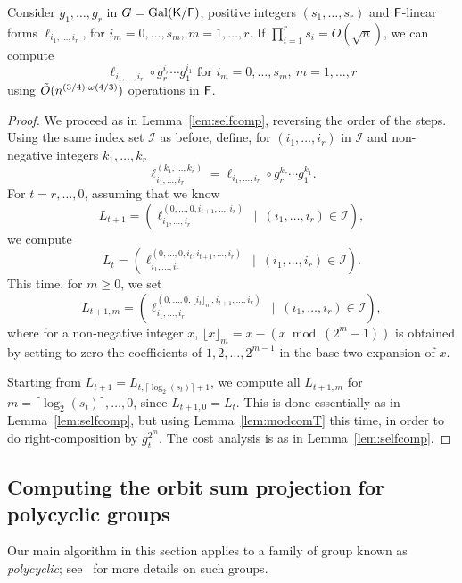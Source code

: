 \begin{lemma}
  \label{lem:transmodcomp}
  Consider $g_1, \ldots, g_r$ in $G=\mathrm{Gal}({\mathsf{K}}/{\mathsf{F}})$, positive
  integers $(s_1, \ldots, s_r)$ and ${\mathsf{F}}$-linear forms $\ell_{i_1,
    \dots, i_r}$, for $i_m=0,\dots,s_m$, $m=1,\dots,r$. If $\prod_{i =
    1}^r s_i = O(\sqrt{n})$, we can compute
  $$\ell_{i_1, \dots, i_r} \circ g_r^{i_r}\cdots g_1^{i_1}
  \text{~for~} i_m=0,\dots,s_m,\ m=1,\dots,r
  $$  using $\tilde{O}(n^{(3/4)\cdot \omega(4/3)})$ operations in ${\mathsf{F}}$.
\end{lemma} 
\begin{proof}
  We proceed as in Lemma~\ref{lem:selfcomp}, reversing the order of
  the steps. Using the same index set $\mathcal I$ as before, define,
  for $(i_1,\dots,i_r)$ in $\mathcal I$ and non-negative integers
  $k_1,\dots,k_r$
  $$\ell_{i_1,\dots,i_r}^{(k_1,\dots,k_r)} =\ell_{i_1,\dots,i_r} \circ g_r^{k_r}\cdots g_1^{k_1}.$$
  For $t=r,\dots,0$, assuming that
  we know 
  $$L_{t+1} = (\ell_{i_1, \dots,i_r}^{(0, \dots, 0,i_{t+1},\dots,i_r)} \ \mid
  \ (i_1,\dots,i_r)\in \mathcal I),$$ we compute 
  $$L_{t}=(\ell_{i_1, \dots,i_r}^{(0, \dots, 0,i_{t},i_{t+1},\dots,i_r)}
  \ \mid \ (i_1,\dots,i_r)\in \mathcal I).$$
  This time, for $m \ge 0$, we set
  $$L_{t+1,m} = (\ell_{i_1, \dots,i_r}^{(0, \dots, 0,\lfloor i_{t}
    \rfloor_m,i_{t+1},\dots,i_r)} \ \mid \ (i_1,\dots,i_r)\in \mathcal
  I),$$ where for a non-negative integer $x$, $\lfloor x \rfloor_m = x
  - (x \bmod (2^m-1))$ is obtained by setting to zero the coefficients
  of $1,2,\dots,2^{m-1}$ in the base-two expansion of $x$.

  Starting from $L_{t+1} = L_{t, \lceil \log_2(s_t) \rceil +1}$, we
  compute all $L_{t+1,m}$ for $m= \lceil \log_2(s_t) \rceil,\dots,0$,
  since $L_{t+1,0} = L_{t}$. This is done essentially as in
  Lemma~\ref{lem:selfcomp}, but using Lemma~\ref{lem:modcomT} this
  time, in order to do right-composition by $g_t^{2^m}$.
  The cost analysis is as in Lemma~\ref{lem:selfcomp}.
\end{proof}


\subsection{Computing the orbit sum projection for polycyclic groups}
\label{ssec:proj_abelian}

Our main algorithm in this section applies to a family of group known
as {\em polycyclic}; see~\cite[Chapter 8]{HoEiOb05} for more details
on such groups.

